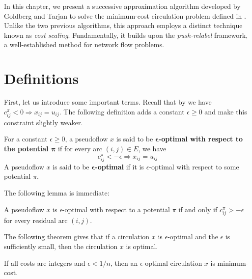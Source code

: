 In this chapter, we present a successive approximation algorithm developed by Goldberg and Tarjan \cite{goldberg-MY} to solve the minimum-cost circulation problem defined in . Unlike the two previous algorithms, this approach employs a distinct technique known as \textit{cost scaling}. Fundamentally, it builds upon the \textit{push-relabel} framework, a well-established method for network flow problems.
\section{Definitions}

First, let us introduce some important terms. Recall that by  we have $c^\pi_{ij} < 0 \Rightarrow x_{ij}=u_{ij}$. The following definition adds a constant $\epsilon \geq 0$ and make this constraint slightly weaker.

\begin{defn}
    For a constant $\epsilon \geq 0$, a pseudoflow $x$ is said to be \textbf{$\boldsymbol{\epsilon}$-optimal with respect to the potential $\boldsymbol\pi$} if for every arc $(i,j)\in E$, we have \[
    c^\pi_{ij} < -\epsilon \Rightarrow x_{ij} = u_{ij}
    \] 
    A pseudoflow $x$ is said to be \textbf{$\boldsymbol{\epsilon}$-optimal} if it is $\epsilon$-optimal with respect to some potential $\pi$.
\end{defn}

The following lemma is immediate:
\begin{lemma}
    A pseudoflow $x$ is $\epsilon$-optimal with respect to a potential $\pi$ if and only if $c^\pi_{ij} > -\epsilon$ for every residual arc $(i,j)$. 
\end{lemma}

The following theorem gives that if a circulation $x$ is $\epsilon$-optimal and the $\epsilon$ is sufficiently small, then the circulation $x$ is optimal.

\begin{theorem} \label{thm:optimal_epsi_circulation}
    If all costs are integers and $\epsilon < 1/n$, then an $\epsilon$-optimal circulation $x$ is minimum-cost.
\end{theorem}
